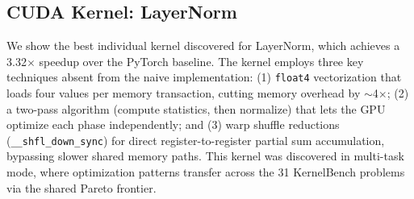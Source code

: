 \documentclass[sigconf]{acmart}
\begin{document}
\subsection{CUDA Kernel: LayerNorm}
\label{app:sol-cuda}

We show the best individual kernel discovered for LayerNorm, which achieves a 3.32$\times$ speedup over the PyTorch baseline. The kernel employs three key techniques absent from the naive implementation: (1) \texttt{float4} vectorization that loads four values per memory transaction, cutting memory overhead by $\sim$4$\times$; (2) a two-pass algorithm (compute statistics, then normalize) that lets the GPU optimize each phase independently; and (3) warp shuffle reductions (\texttt{\_\_shfl\_down\_sync}) for direct register-to-register partial sum accumulation, bypassing slower shared memory paths. This kernel was discovered in multi-task mode, where optimization patterns transfer across the 31 KernelBench problems via the shared Pareto frontier.
\end{document}
